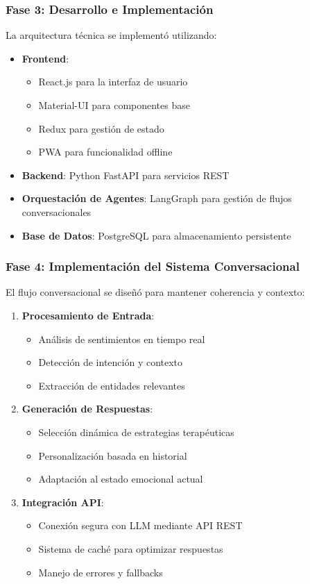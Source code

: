 \documentclass[conference]{IEEEtran}
\begin{document}
\subsubsection{Fase 3: Desarrollo e Implementación}
La arquitectura técnica se implementó utilizando:

\begin{itemize}
\item \textbf{Frontend}: 
    \begin{itemize}
    \item React.js para la interfaz de usuario
    \item Material-UI para componentes base
    \item Redux para gestión de estado
    \item PWA para funcionalidad offline
    \end{itemize}
\item \textbf{Backend}: Python FastAPI para servicios REST
\item \textbf{Orquestación de Agentes}: LangGraph para gestión de flujos conversacionales
\item \textbf{Base de Datos}: PostgreSQL para almacenamiento persistente
\end{itemize}

\subsubsection{Fase 4: Implementación del Sistema Conversacional}
El flujo conversacional se diseñó para mantener coherencia y contexto:

\begin{enumerate}
\item \textbf{Procesamiento de Entrada}:
    \begin{itemize}
    \item Análisis de sentimientos en tiempo real
    \item Detección de intención y contexto
    \item Extracción de entidades relevantes
    \end{itemize}
\item \textbf{Generación de Respuestas}:
    \begin{itemize}
    \item Selección dinámica de estrategias terapéuticas
    \item Personalización basada en historial
    \item Adaptación al estado emocional actual
    \end{itemize}
\item \textbf{Integración API}:
    \begin{itemize}
    \item Conexión segura con LLM mediante API REST
    \item Sistema de caché para optimizar respuestas
    \item Manejo de errores y fallbacks
    \end{itemize}
\end{enumerate}
\end{document}
